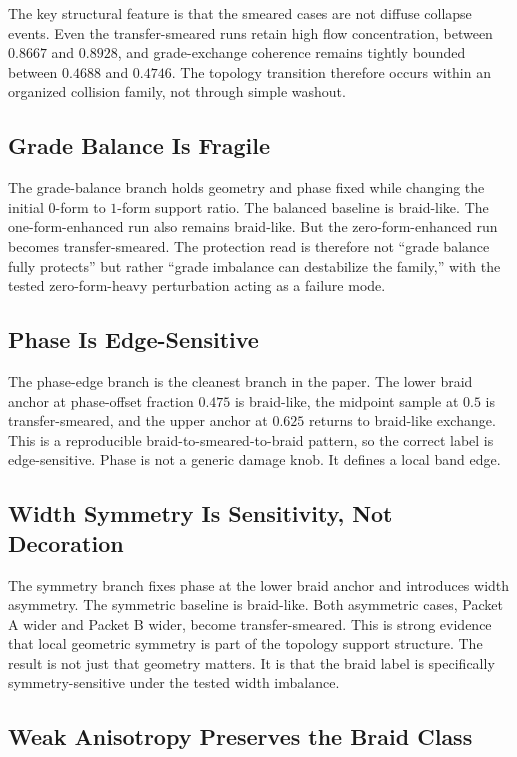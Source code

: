 \documentclass[11pt]{article}
\begin{document}
The key structural feature is that the smeared cases are not diffuse collapse events. Even the transfer-smeared runs retain high flow concentration, between $0.8667$ and $0.8928$, and grade-exchange coherence remains tightly bounded between $0.4688$ and $0.4746$. The topology transition therefore occurs within an organized collision family, not through simple washout.

\subsection{Grade Balance Is Fragile}

The grade-balance branch holds geometry and phase fixed while changing the initial $0$-form to $1$-form support ratio. The balanced baseline is braid-like. The one-form-enhanced run also remains braid-like. But the zero-form-enhanced run becomes transfer-smeared. The protection read is therefore not ``grade balance fully protects'' but rather ``grade imbalance can destabilize the family,'' with the tested zero-form-heavy perturbation acting as a failure mode.

\subsection{Phase Is Edge-Sensitive}

The phase-edge branch is the cleanest branch in the paper. The lower braid anchor at phase-offset fraction $0.475$ is braid-like, the midpoint sample at $0.5$ is transfer-smeared, and the upper anchor at $0.625$ returns to braid-like exchange. This is a reproducible braid-to-smeared-to-braid pattern, so the correct label is edge-sensitive. Phase is not a generic damage knob. It defines a local band edge.

\subsection{Width Symmetry Is Sensitivity, Not Decoration}

The symmetry branch fixes phase at the lower braid anchor and introduces width asymmetry. The symmetric baseline is braid-like. Both asymmetric cases, Packet A wider and Packet B wider, become transfer-smeared. This is strong evidence that local geometric symmetry is part of the topology support structure. The result is not just that geometry matters. It is that the braid label is specifically symmetry-sensitive under the tested width imbalance.

\subsection{Weak Anisotropy Preserves the Braid Class}
\end{document}
